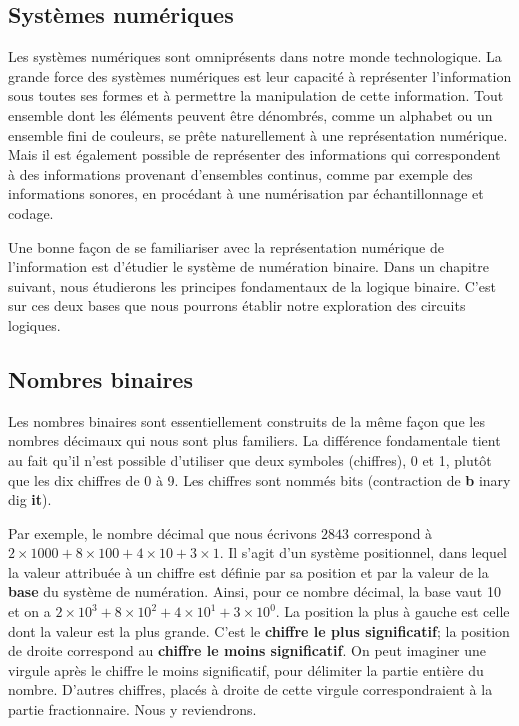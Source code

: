 \documentclass[11pt]{article}
\begin{document}
\subsection{Systèmes numériques}
\label{sec:org5dbb8de}

Les systèmes numériques sont omniprésents dans notre monde
technologique. La grande force des systèmes numériques est leur
capacité à représenter l'information sous toutes ses formes et à
permettre la manipulation de cette information. Tout ensemble dont les
éléments peuvent être dénombrés, comme un alphabet ou un ensemble fini
de couleurs, se prête naturellement à une représentation
numérique. Mais il est également possible de représenter des
informations qui correspondent à des informations provenant
d'ensembles continus, comme par exemple des informations sonores, en
procédant à une numérisation par échantillonnage et codage. 

Une bonne façon de se familiariser avec la représentation numérique de
l'information est d'étudier le système de numération binaire. Dans un
chapitre suivant, nous étudierons les principes fondamentaux de la
logique binaire. C'est sur ces deux bases que nous pourrons établir
notre exploration des circuits logiques.

\subsection{Nombres binaires}
\label{sec:org48e23e4}

Les nombres binaires sont essentiellement construits de la même façon
que les nombres décimaux qui nous sont plus familiers. La
différence fondamentale tient au fait qu'il n'est possible d'utiliser
que deux symboles (chiffres), 0 et 1, plutôt que les dix chiffres de 0
à 9. Les chiffres sont nommés bits (contraction de \textbf{b} inary dig
\textbf{it}).

Par exemple, le nombre décimal que nous écrivons \(2843\) correspond à
\(2 \times 1000 + 8 \times 100 + 4 \times 10 + 3 \times 1\). Il s'agit
d'un système positionnel, dans lequel la valeur attribuée à un chiffre
est définie par sa position et par la valeur de la \textbf{base} du système
de numération. Ainsi, pour ce nombre décimal, la base vaut 10 et on a
\(2 \times 10^3 + 8 \times 10^2 + 4 \times 10^1 + 3 \times 10^0\). La
position la plus à gauche est celle dont la valeur est la plus
grande. C'est le \textbf{chiffre le plus significatif}; la position de droite
correspond au \textbf{chiffre le moins significatif}. On peut imaginer une
virgule après le chiffre le moins significatif, pour délimiter la
partie entière du nombre. D'autres chiffres, placés à droite de cette
virgule correspondraient à la partie fractionnaire. Nous y reviendrons.
\end{document}
